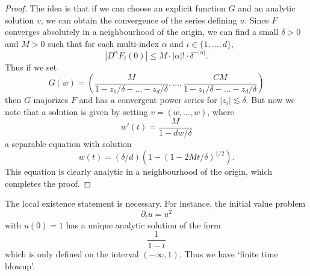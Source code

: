 \begin{proof}
    The idea is that if we can choose an explicit function $G$ and an analytic solution $v$, we can obtain the convergence of the series defining $u$. Since $F$ converges absolutely in a neighbourhood of the origin, we can find a small $\delta > 0$ and $M > 0$ such that for each multi-index $\alpha$ and $i \in \{ 1, \dots, d \}$,
    \[ |D^\alpha F_i(0)| \leq M \cdot |\alpha|! \cdot \delta^{-|\alpha|}. \]
    Thus if we set
    \[ G(w) = \left( \frac{M}{1 - z_1/\delta - \dots - z_d/\delta}, \dots, \frac{CM}{1 - z_1/\delta - \dots - z_d/\delta} \right) \]
    then $G$ majorizes $F$ and has a convergent power series for $|z_i| \lesssim \delta$. But now we note that a solution is given by setting $v = (w,\dots,w)$, where
    \[ w'(t) = \frac{M}{1 - dw/\delta} \]
    a separable equation with solution
    \[ w(t) = (\delta/d)(1 - (1 - 2Mt/\delta)^{1/2}). \]
    This equation is clearly analytic in a neighbourhood of the origin, which completes the proof.
\end{proof}

\begin{remark}
    The local existence statement is necessary. For instance, the initial value problem
    \[ \partial_t u = u^2 \]
    with $u(0) = 1$ has a unique analytic solution of the form
    \[ \frac{1}{1 - t} \]
    which is only defined on the interval $(-\infty,1)$. Thus we have `finite time blowup'.
\end{remark}

